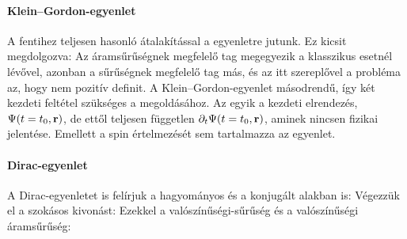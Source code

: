     
   \paragraph{Klein--Gordon-egyenlet}
    
    A fentihez teljesen hasonló átalakítással a
    egyenletre jutunk. Ez kicsit megdolgozva:
    Az áramsűrűségnek megfelelő tag megegyezik a klasszikus esetnél lévővel, azonban a sűrűségnek megfelelő tag más, és az itt szereplővel a probléma az, hogy nem pozitív definit. A Klein--Gordon-egyenlet másodrendű, így két kezdeti feltétel szükséges a megoldásához. Az egyik a kezdeti elrendezés, $\Psi(t=t_0,\mathbf{r})$, de ettől teljesen független $\partial_t\Psi(t=t_0,\mathbf{r})$, aminek nincsen fizikai jelentése. Emellett a spin értelmezését sem tartalmazza az egyenlet.
    
   \paragraph{Dirac-egyenlet}
    
    A Dirac-egyenletet is felírjuk a hagyományos és a konjugált alakban is:
    Végezzük el a szokásos kivonást:
    Ezekkel a valószínűségi-sűrűség és a valószínűségi áramsűrűség:
    
